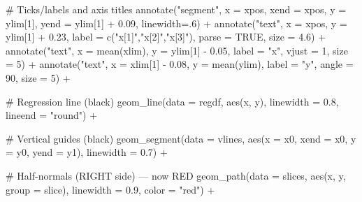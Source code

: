 \documentclass[
  letterpaper,
  DIV=11,
  numbers=noendperiod]{scrreprt}
\newenvironment{Shaded}{\begin{snugshade}}{\end{snugshade}}
\newcommand{\AttributeTok}[1]{\textcolor[rgb]{0.40,0.45,0.13}{#1}}
\newcommand{\CommentTok}[1]{\textcolor[rgb]{0.37,0.37,0.37}{#1}}
\newcommand{\ConstantTok}[1]{\textcolor[rgb]{0.56,0.35,0.01}{#1}}
\newcommand{\DecValTok}[1]{\textcolor[rgb]{0.68,0.00,0.00}{#1}}
\newcommand{\FloatTok}[1]{\textcolor[rgb]{0.68,0.00,0.00}{#1}}
\newcommand{\FunctionTok}[1]{\textcolor[rgb]{0.28,0.35,0.67}{#1}}
\newcommand{\NormalTok}[1]{\textcolor[rgb]{0.00,0.23,0.31}{#1}}
\newcommand{\SpecialCharTok}[1]{\textcolor[rgb]{0.37,0.37,0.37}{#1}}
\newcommand{\StringTok}[1]{\textcolor[rgb]{0.13,0.47,0.30}{#1}}
\begin{document}
\begin{Shaded}
\begin{Highlighting}[]
  \CommentTok{\# Ticks/labels and axis titles}
  \FunctionTok{annotate}\NormalTok{(}\StringTok{"segment"}\NormalTok{, }\AttributeTok{x =}\NormalTok{ xpos, }\AttributeTok{xend =}\NormalTok{ xpos, }\AttributeTok{y =}\NormalTok{ ylim[}\DecValTok{1}\NormalTok{], }\AttributeTok{yend =}\NormalTok{ ylim[}\DecValTok{1}\NormalTok{] }\SpecialCharTok{+} \FloatTok{0.09}\NormalTok{, }\AttributeTok{linewidth=}\NormalTok{.}\DecValTok{6}\NormalTok{) }\SpecialCharTok{+}
  \FunctionTok{annotate}\NormalTok{(}\StringTok{"text"}\NormalTok{, }\AttributeTok{x =}\NormalTok{ xpos, }\AttributeTok{y =}\NormalTok{ ylim[}\DecValTok{1}\NormalTok{] }\SpecialCharTok{+} \FloatTok{0.23}\NormalTok{,}
           \AttributeTok{label =} \FunctionTok{c}\NormalTok{(}\StringTok{"x[1]"}\NormalTok{,}\StringTok{"x[2]"}\NormalTok{,}\StringTok{"x[3]"}\NormalTok{), }\AttributeTok{parse =} \ConstantTok{TRUE}\NormalTok{, }\AttributeTok{size =} \FloatTok{4.6}\NormalTok{) }\SpecialCharTok{+}
  \FunctionTok{annotate}\NormalTok{(}\StringTok{"text"}\NormalTok{, }\AttributeTok{x =} \FunctionTok{mean}\NormalTok{(xlim), }\AttributeTok{y =}\NormalTok{ ylim[}\DecValTok{1}\NormalTok{] }\SpecialCharTok{{-}} \FloatTok{0.05}\NormalTok{, }\AttributeTok{label =} \StringTok{"x"}\NormalTok{, }\AttributeTok{vjust =} \DecValTok{1}\NormalTok{, }\AttributeTok{size =} \DecValTok{5}\NormalTok{) }\SpecialCharTok{+}
  \FunctionTok{annotate}\NormalTok{(}\StringTok{"text"}\NormalTok{, }\AttributeTok{x =}\NormalTok{ xlim[}\DecValTok{1}\NormalTok{] }\SpecialCharTok{{-}} \FloatTok{0.08}\NormalTok{, }\AttributeTok{y =} \FunctionTok{mean}\NormalTok{(ylim), }\AttributeTok{label =} \StringTok{"y"}\NormalTok{, }\AttributeTok{angle =} \DecValTok{90}\NormalTok{, }\AttributeTok{size =} \DecValTok{5}\NormalTok{) }\SpecialCharTok{+}

  \CommentTok{\# Regression line (black)}
  \FunctionTok{geom\_line}\NormalTok{(}\AttributeTok{data =}\NormalTok{ regdf, }\FunctionTok{aes}\NormalTok{(x, y), }\AttributeTok{linewidth =} \FloatTok{0.8}\NormalTok{, }\AttributeTok{lineend =} \StringTok{"round"}\NormalTok{) }\SpecialCharTok{+}

  \CommentTok{\# Vertical guides (black)}
  \FunctionTok{geom\_segment}\NormalTok{(}\AttributeTok{data =}\NormalTok{ vlines, }\FunctionTok{aes}\NormalTok{(}\AttributeTok{x =}\NormalTok{ x0, }\AttributeTok{xend =}\NormalTok{ x0, }\AttributeTok{y =}\NormalTok{ y0, }\AttributeTok{yend =}\NormalTok{ y1), }\AttributeTok{linewidth =} \FloatTok{0.7}\NormalTok{) }\SpecialCharTok{+}

  \CommentTok{\# Half{-}normals (RIGHT side) — now RED}
  \FunctionTok{geom\_path}\NormalTok{(}\AttributeTok{data =}\NormalTok{ slices, }\FunctionTok{aes}\NormalTok{(x, y, }\AttributeTok{group =}\NormalTok{ slice), }\AttributeTok{linewidth =} \FloatTok{0.9}\NormalTok{, }\AttributeTok{color =} \StringTok{"red"}\NormalTok{) }\SpecialCharTok{+}


\end{Highlighting}
\end{Shaded}
\end{document}
